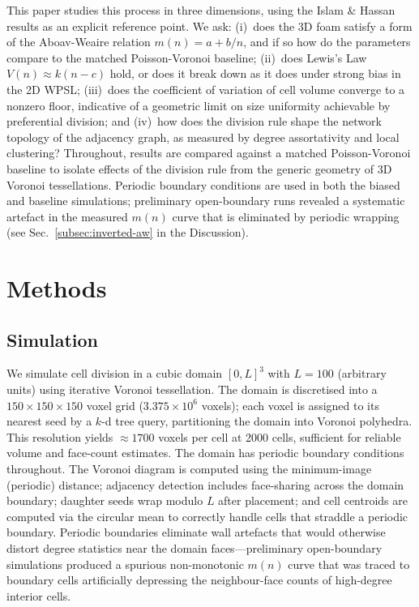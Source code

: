 \documentclass[aps,pre,reprint,amsmath,amssymb,floatfix]{revtex4-2}
\begin{document}
This paper studies this process in three dimensions, using the Islam \& Hassan
results as an explicit reference point.
We ask: (i)~does the 3D foam satisfy a form of the Aboav-Weaire relation
$m(n)=a+b/n$, and if so how do the parameters compare to the matched
Poisson-Voronoi baseline; (ii)~does Lewis's Law $V(n)\approx k(n-c)$ hold,
or does it break down as it does under strong bias in the 2D WPSL;
(iii)~does the coefficient of variation of cell volume converge to a nonzero
floor, indicative of a geometric limit on size uniformity achievable by
preferential division; and (iv)~how does the division rule shape the network
topology of the adjacency graph, as measured by degree assortativity and
local clustering?
Throughout, results are compared against a matched Poisson-Voronoi baseline
to isolate effects of the division rule from the generic geometry of 3D
Voronoi tessellations.
Periodic boundary conditions are used in both the biased and baseline
simulations; preliminary open-boundary runs revealed a systematic artefact
in the measured $m(n)$ curve that is eliminated by periodic wrapping
(see Sec.~\ref{subsec:inverted-aw} in the Discussion).

\section{Methods}

\subsection{Simulation}

We simulate cell division in a cubic domain $[0,L]^3$ with $L=100$
(arbitrary units) using iterative Voronoi tessellation.
The domain is discretised into a $150\times150\times150$ voxel grid
($3.375\times10^6$ voxels); each voxel is assigned to its nearest seed by a
$k$-d tree query, partitioning the domain into Voronoi polyhedra.
This resolution yields $\approx1700$ voxels per cell at 2000 cells, sufficient
for reliable volume and face-count estimates.
The domain has periodic boundary conditions throughout.
The Voronoi diagram is computed using the minimum-image (periodic) distance;
adjacency detection includes face-sharing across the domain boundary;
daughter seeds wrap modulo $L$ after placement; and cell centroids are
computed via the circular mean to correctly handle cells that straddle a
periodic boundary.
Periodic boundaries eliminate wall artefacts that would otherwise distort
degree statistics near the domain faces---preliminary open-boundary
simulations produced a spurious non-monotonic $m(n)$ curve that was traced
to boundary cells artificially depressing the neighbour-face counts of
high-degree interior cells.
\end{document}

